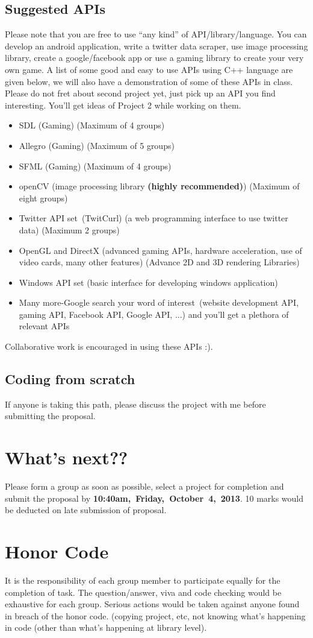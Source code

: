 \documentclass[11pt]{article}
\begin{document}
\subsection*{Suggested APIs}
Please note that you are free to use ``any kind'' of
API/library/language. You can develop an android application, write a
twitter data scraper, use image processing library, create a
google/facebook app or use a gaming library to create your very own
game. A list of some good and easy to use APIs using C++ language are
given below, we will also have a demonstration of some of these APIs
in class. Please do not fret about second project yet, just pick up an
API you find interesting. You'll get ideas of Project 2 while working
on them.
\begin{itemize}
\item SDL (Gaming) (Maximum of 4 groups)
\item Allegro (Gaming) (Maximum of 5 groups)
\item SFML (Gaming) (Maximum of 4 groups)
\item openCV (image processing library \textbf{(highly recommended)}) (Maximum of eight groups)
\item Twitter API set~(TwitCurl) (a web programming interface to use twitter
  data) (Maximum 2 groups) 
\item OpenGL and DirectX (advanced gaming APIs, hardware acceleration,
  use of video cards, many other features) (Advance 2D and 3D rendering Libraries)
\item Windows API set (basic interface for developing windows
  application)
\item Many more-Google search your word of interest~(website
  development API, gaming API, Facebook API, Google API, ...) and
  you'll get a plethora of relevant APIs
\end{itemize}

Collaborative work is encouraged in using these APIs :).
\subsection*{Coding from scratch}
If anyone is taking this path, please discuss the project with me before submitting the proposal.

\section*{What's next??}
Please form a group as soon as possible, select a project for
completion and submit the proposal by \textbf{10:40am,~Friday,~October~4,~2013}. 10 marks would be deducted on late submission of proposal.

\section{Honor Code}
It is the responsibility of each group member to participate equally for the completion of task. The question/answer, viva and code checking would be exhaustive for each group. Serious actions would be taken against anyone found in breach of the honor code. (copying project, etc, not knowing what's happening in code (other than what's happening at library level). 
\end{document}
